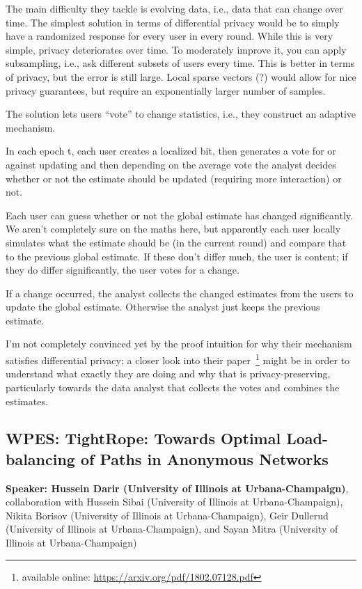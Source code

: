 \documentclass{article}
\begin{document}
The main difficulty they tackle is evolving data, i.e., data that can change over time. The simplest solution in terms of differential privacy would be to simply have a randomized response for every user in every round. While this is very simple, privacy deteriorates over time. To moderately improve it, you can apply subsampling, i.e., ask different subsets of users every time. This is better in terms of privacy, but the error is still large.
Local sparse vectors (?) would allow for nice privacy guarantees, but require an exponentially larger number of samples.

The solution lets users “vote” to change statistics, i.e., they construct an adaptive mechanism.


In each epoch t, each user creates a localized bit, then generates a vote for or against updating and then depending on the average vote the analyst decides whether or not the estimate should be updated (requiring more interaction) or not.

Each user can guess whether or not the global estimate has changed significantly. We aren’t completely sure on the maths here, but apparently each user locally simulates what the estimate should be (in the current round) and compare that to the previous global estimate. If these don’t differ much, the user is content; if they do differ significantly, the user votes for a change.

If a change occurred, the analyst collects the changed estimates from the users to update the global estimate. Otherwise the analyst just keeps the previous estimate.

I’m not completely convinced yet by the proof intuition for why their mechanism satisfies differential privacy; a closer look into their paper~\footnote{available online: \url{https://arxiv.org/pdf/1802.07128.pdf}} might be in order to understand what exactly they are doing and why that is privacy-preserving, particularly towards the data analyst that collects the votes and combines the estimates.


\subsection{WPES: TightRope: Towards Optimal Load-balancing of Paths in Anonymous Networks}
\noindent\textbf{Speaker: Hussein Darir (University of Illinois at Urbana-Champaign)}, collaboration with Hussein Sibai (University of Illinois at Urbana-Champaign), Nikita Borisov (University of Illinois at Urbana-Champaign), Geir Dullerud (University of Illinois at Urbana-Champaign), and Sayan Mitra (University of Illinois at Urbana-Champaign)\\
\end{document}
